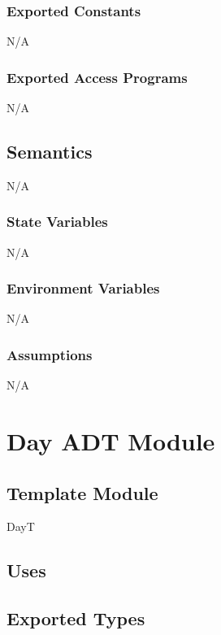 \documentclass[12pt, titlepage]{article}
\begin{document}
\subsubsection{Exported Constants}
N/A\\

\subsubsection{Exported Access Programs}
N/A\\

\subsection{Semantics}
N/A\\
\subsubsection{State Variables}
N/A\\

\subsubsection{Environment Variables}

N/A\\

\subsubsection{Assumptions}
N/A\\

\newpage


\section{Day ADT Module} \label{ModuleADTD} 

\subsection{Template Module}
DayT

\subsection{Uses}



\subsection{Exported Types}
\end{document}
